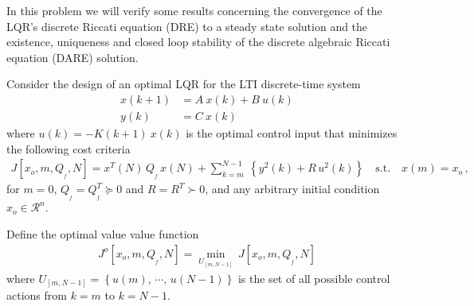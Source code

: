 \item
In this problem we will verify some results concerning the convergence of the LQR's discrete Riccati equation (DRE) to a steady state solution and the existence, uniqueness and closed loop stability of the discrete algebraic Riccati equation (DARE) solution.


Consider the design of an optimal LQR for the LTI discrete-time system
\begin{align}
    \label{abc1}
    x(k+1) & = A \: x(k) + B \: u(k) \\
    y(k) & = C \: x(k) \, \nonumber
\end{align}
where $u(k) = -K(k+1) \: x(k)$ is the optimal control input that minimizes the following cost criteria
\begin{align*}
    J[x_o, m, Q_{_f},N] = x^T(N)\, Q_{_f} \, x(N) + \sum_{k=m}^{N-1} \: \left \{ y^2(k) + R\,u^2(k) \right \}
        \quad \textrm{s.t.} \quad x(m) = x_o\,,
\end{align*}
for $m = 0$, $Q_{_f} = Q_{_f}^T \succeq 0$ and $R = R^T \succ 0$, and any arbitrary initial condition $x_o \in \mathcal{R}^n$.

Define the optimal value value function
\begin{align*}
    J^o[x_o, m, Q_{_f},N] = \min_{U_{[m,N-1]}} \, J[x_o, m, Q_{_f},N]
\end{align*}
where $U_{[m,N-1]} = \left \{ u(m),\, \cdots , \, u(N-1)\right \}$ is the set of all possible control actions from $k=m$ to $k=N-1$.

